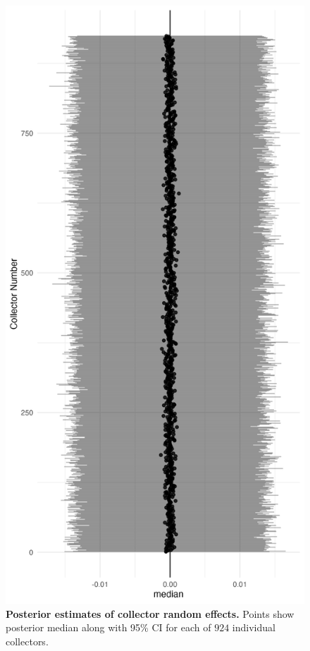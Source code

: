 \documentclass[11pt]{article}
\begin{document}
\begin{figure}[H]
	\centering
	\includegraphics[width = .6\linewidth]{../Plots/collector_posterior.png}
	\caption{\textbf{Posterior estimates of collector random effects.} Points show posterior median along with 95\% CI for each of $924$ individual collectors.}
		\label{fig:collector_fx}
\end{figure}
\end{document}
